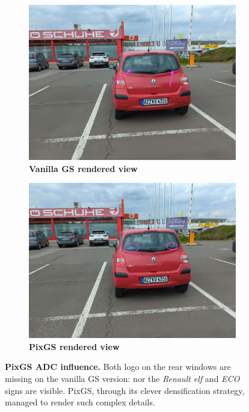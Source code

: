 \begin{figure}[htb!]
  \centering
  \begin{subfigure}[b]{0.45\linewidth}
    \includegraphics[width=\linewidth]{images/gaussiansplatting/00029-gs.png}
    \caption{\textbf{Vanilla GS rendered view}}
    \label{fig:view3}
  \end{subfigure}
  \quad %
  \begin{subfigure}[b]{0.45\linewidth}
    \includegraphics[width=\linewidth]{images/gaussiansplatting/00029-pixgs.png}
    \caption{\textbf{PixGS rendered view}}
    \label{fig:gs-view3-gs}
  \end{subfigure}
  \caption{\textbf{PixGS ADC influence.} Both logo on the rear windows are missing on the vanilla \ac{GS} version: nor the \textit{Renault elf} and \textit{ECO} signs are visible. PixGS, through its clever densification strategy, managed to render such complex details.}
  \label{fig:gs-pigs}
\end{figure}


